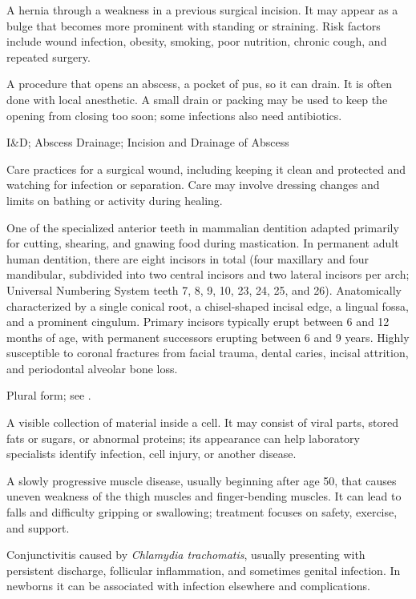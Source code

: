  A hernia through a weakness in a previous surgical incision. It may appear as a bulge that
becomes more prominent with standing or straining. Risk factors include wound infection, obesity, smoking, poor
nutrition, chronic cough, and repeated surgery.

 A procedure that opens an abscess, a pocket of pus, so it can drain. It is often done with local anesthetic. A small drain or packing may be used to keep the opening from closing too soon; some infections also need antibiotics.

\synonyms
I\&D; Abscess Drainage; Incision and Drainage of Abscess

 Care practices for a surgical wound, including keeping it clean and protected and watching for infection or separation. Care may involve dressing changes and limits on bathing or activity during healing.

 One of the specialized anterior teeth in mammalian dentition adapted primarily for cutting, shearing, and gnawing food during mastication. In permanent adult human dentition, there are eight incisors in total (four maxillary and four mandibular, subdivided into two central incisors and two lateral incisors per arch; Universal Numbering System teeth 7, 8, 9, 10, 23, 24, 25, and 26). Anatomically characterized by a single conical root, a chisel-shaped incisal edge, a lingual fossa, and a prominent cingulum. Primary incisors typically erupt between 6 and 12 months of age, with permanent successors erupting between 6 and 9 years. Highly susceptible to coronal fractures from facial trauma, dental caries, incisal attrition, and periodontal alveolar bone loss.

 Plural form; see .

 A visible collection of material inside a cell. It may consist of viral parts, stored fats or sugars, or abnormal proteins; its appearance can help laboratory specialists identify infection, cell injury, or another disease.

 A slowly progressive muscle disease, usually beginning after age 50, that causes uneven weakness of the thigh muscles and finger-bending muscles. It can lead to falls and difficulty gripping or swallowing; treatment focuses on safety, exercise, and support.

 Conjunctivitis caused by \textit{Chlamydia trachomatis}, usually presenting with persistent discharge, follicular inflammation, and sometimes genital infection. In newborns it can be associated with infection elsewhere and complications.

